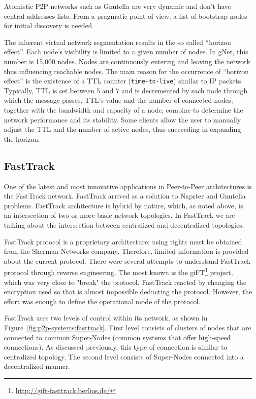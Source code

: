 Atomistic P2P networks such as Gnutella are very dynamic and don't have central
addresses lists. From a pragmatic point of view, a list of bootstrap nodes for
initial discovery is needed.

The inherent virtual network segmentation results in the so called ``horizon
effect''. Each node's visibility is limited to a given number of nodes. In
gNet, this number is 15,000 nodes. Nodes are continuously entering and leaving
the network thus influencing reachable nodes. The main reason for the
occurrence of ``horizon effect'' is the existence of a TTL counter
(\texttt{time-to-live}) similar to IP packets. Typically, TTL is set between 5
and 7 and is decremented by each node through which the message passes. TTL's
value and the number of connected nodes, together with the bandwidth and
capacity of a node, combine to determine the network performance and its
stability. Some clients allow the user to manually adjust the TTL and the
number of active nodes, thus succeeding in expanding the horizon.

\subsection{FastTrack}

One of the latest and most innovative  applications in Peer-to-Peer
architectures is the FastTrack network. FastTrack arrived as a solution to
Napster and Gnutella problems. FastTrack architecture is hybrid by nature,
which, as noted above, is an intersection of two or more basic network
topologies. In FastTrack we are talking about the intersection between
centralized and decentralized topologies.

FastTrack protocol is a proprietary architecture; using rights must be obtained
from the Sherman Networks company. Therefore, limited information is provided
about the current protocol. There were several attempts to understand
FastTrack protocol through reverse engineering. The most known is the
giFT\footnote{\url{http://gift-fasttrack.berlios.de/}}
project, which was very close to "break" the protocol. FastTrack reacted by
changing the encryption used so that is almost impossible deducting the
protocol. However, the effort was enough to define the operational mode of
the protocol.

FastTrack uses two levels of control within its network, as shown in
Figure~\ref{fig:p2p-systems:fasttrack}. First level consists of clusters of
nodes that are connected to common Super-Nodes (common systems that offer
high-speed connections). As discussed previously, this type of connection is
similar to centralized topology. The second level consists of Super-Nodes
connected into a decentralized manner.


